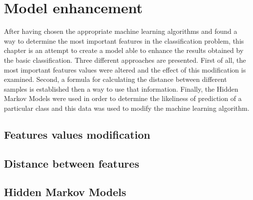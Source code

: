 \chapter{Model enhancement}
After having chosen the appropriate machine learning algorithms and found a way to determine the most important features in the classification problem, this chapter is an attempt to create a model able to enhance the results obtained by the basic classification. Three different approaches are presented. First of all, the most important features values were altered and the effect of this modification is examined. Second, a formula for calculating the distance between different samples is established then a way to use that information. Finally, the Hidden Markov Models were used in order to determine the likeliness of prediction of a particular class and this data was used to modify the machine learning algorithm. 

\section{Features values modification}

\section{Distance between features}

\section{Hidden Markov Models}